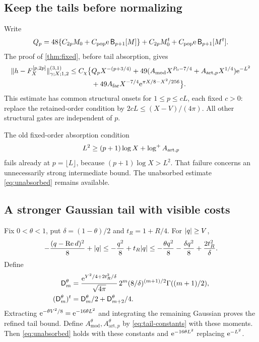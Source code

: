 \subsection{Keep the tails before normalizing}
Write
\[
 Q_p=48\{C_{2p}M_0+C_{\mathrm{pop}}\mathrm e\,\mathsf B_{p+1}[M]\}
       +C_{2p}M_0^t+C_{\mathrm{pop}}\mathrm e\,\mathsf B_{p+1}[M^t].
\]
The proof of \cref{thm:fixed}, before tail absorption, gives
\begin{align}
 \lVert h-F_X^{[p,2p]}\rVert_{\gamma;X;1,2}^{(3,1)}
 \le C_\chi\bigl\{&
 Q_pX^{-(p+3/4)}
 +49(A_{\mathrm{mod}}X^{P_0-7/4}
                   +A_{\mathrm{art},p}X^{1/4})\mathrm e^{-L^2}\nonumber\\
 &+49A_{\mathrm{far}}X^{-7/4}
                       \mathrm e^{\pi X/8-X^2/256}\bigr\}.
 \label{eq:unabsorbed}
\end{align}
This estimate has common structural onsets for \(1\le p\le cL\),
each fixed \(c>0\): replace the retained-order condition by
\(2cL\le(X-V)/(4\pi)\). All other structural gates are
independent of \(p\).

The old fixed-order absorption condition
\[
 L^2\ge(p+1)\log X+\log^{+} A_{\mathrm{art},p}
\]
fails already at \(p=\lfloor L\rfloor\), because
\((p+1)\log X>L^2\).
That failure concerns an unnecessarily strong intermediate bound.
The unabsorbed estimate \eqref{eq:unabsorbed} remains available.

\subsection{A stronger Gaussian tail with visible costs}
Fix \(0<\theta<1\), put \(\delta=(1-\theta)/2\) and \(t_R=1+R/4\).
For \(\lvert q\rvert\ge V\),
\[
 -\frac{(q-\operatorname{Re} d)^2}{8}+\lvert q\rvert
 \le-\frac{q^2}{8}+t_R\lvert q\rvert
 \le-\frac{\theta q^2}{8}-\frac{\delta q^2}{8}
                         +\frac{2t_R^2}{\delta}.
\]
Define
\begin{subequations}\label{eq:theta-moments}
\begin{align}
 \mathsf D_m^\theta
 &=\frac{\mathrm e^{Y^2/4+2t_R^2/\delta}}{\sqrt{4\pi}}\,
          2^m(8/\delta)^{(m+1)/2}\Gamma((m+1)/2),\\
 (\mathsf D_m^\theta)^t
 &=\mathsf D_m^\theta/2+\mathsf D_{m+2}^\theta/4.
\end{align}
\end{subequations}
Extracting \(\mathrm e^{-\theta V^2/8}=\mathrm e^{-16\theta L^2}\)
and integrating the remaining Gaussian proves the refined tail
bound. Define \(A_{\mathrm{mod}}^\theta,A_{\mathrm{art},p}^\theta\)
by \eqref{eq:tail-constants} with these moments.
Then \eqref{eq:unabsorbed} holds with these constants and
\(\mathrm e^{-16\theta L^2}\) replacing \(\mathrm e^{-L^2}\).


